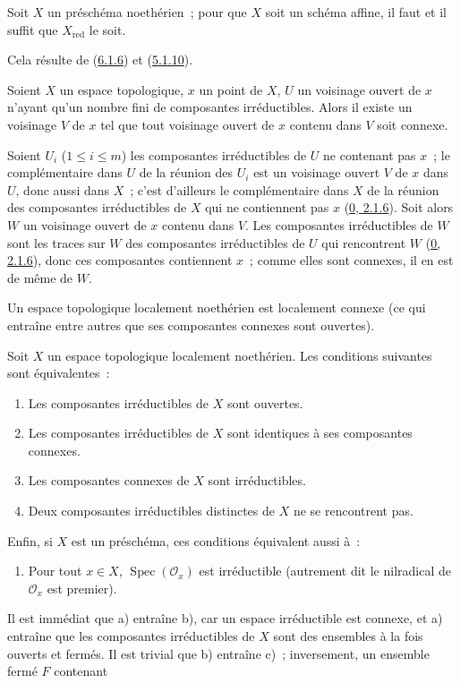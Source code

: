 \begin{corollary}[6.1.7]
\label{I.6.1.7-fr}
Soit $X$ un préschéma noethérien~; pour que $X$ soit un schéma affine, il faut
et il suffit que $X_{\mathrm{red}}$ le soit.
\end{corollary}

Cela résulte de (\hyperref[I.6.1.6-fr]{6.1.6}) et
(\hyperref[I.5.1.10-fr]{5.1.10}).

\begin{lemma}[6.1.8]
\label{I.6.1.8-fr}
Soient $X$ un espace topologique, $x$ un point de $X$, $U$ un voisinage ouvert
de $x$ n'ayant qu'un nombre fini de composantes irréductibles. Alors il existe
un voisinage $V$ de $x$ tel que tout voisinage ouvert de $x$ contenu dans $V$
soit connexe.
\end{lemma}

Soient $U_i$ ($1\leq i\leq m$) les composantes irréductibles de $U$ ne
contenant pas $x$~; le complémentaire dans $U$ de la réunion des $U_i$ est un
voisinage ouvert $V$ de $x$ dans $U$, donc aussi dans $X$~; c'est d'ailleurs
le complémentaire dans $X$ de la réunion des composantes irréductibles de $X$
qui ne contiennent pas $x$ (\hyperref[0.2.1.6-fr]{0, 2.1.6}). Soit alors $W$
un voisinage ouvert de $x$ contenu dans $V$. Les composantes irréductibles de
$W$ sont les traces sur $W$ des composantes irréductibles de $U$ qui
rencontrent $W$ (\hyperref[0.2.1.6-fr]{0, 2.1.6}), donc ces composantes
contiennent $x$~; comme elles sont connexes, il en est de même de $W$.

\begin{corollary}[6.1.9]
\label{I.6.1.9-fr}
Un espace topologique localement noethérien est localement connexe (ce qui
entraîne entre autres que ses composantes connexes sont ouvertes).
\end{corollary}

\begin{proposition}[6.1.10]
\label{I.6.1.10-fr}
Soit $X$ un espace topologique localement noethérien. Les conditions suivantes
sont équivalentes~:
\begin{enumerate}
  \item[a)] Les composantes irréductibles de $X$ sont ouvertes.
  \item[b)] Les composantes irréductibles de $X$ sont identiques à ses
    composantes connexes.
  \item[c)] Les composantes connexes de $X$ sont irréductibles.
  \item[d)] Deux composantes irréductibles distinctes de $X$ ne se rencontrent
    pas.
\end{enumerate}

Enfin, si $X$ est un préschéma, ces conditions équivalent aussi à~:
\begin{enumerate}
  \item[e)] Pour tout $x\in X$, $\operatorname{Spec}(\mathscr{O}_x)$ est
    irréductible (autrement dit le nilradical de $\mathscr{O}_x$ est premier).
\end{enumerate}
\end{proposition}

Il est immédiat que a) entraîne b), car un espace irréductible est connexe, et
a) entraîne que les composantes irréductibles de $X$ sont des ensembles à la
fois ouverts et fermés. Il est trivial que b) entraîne c)~; inversement, un
ensemble fermé $F$ contenant
